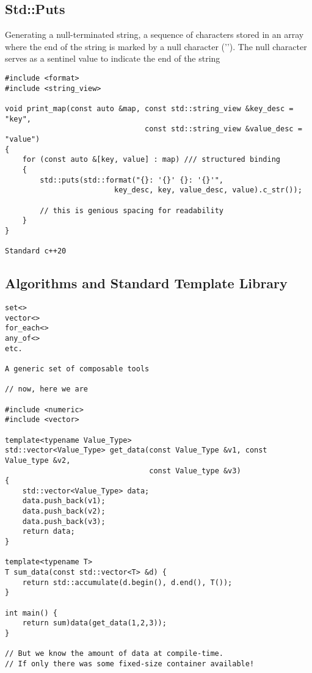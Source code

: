 \documentclass[openany]{report}
\begin{document}
\subsection{Std::Puts}

Generating a null-terminated string,  a sequence of characters stored in an array
where the end of the string is marked by a null character ('\0'). 
The null character serves as a sentinel value to indicate the end of the string

\begin{verbatim}
#include <format>
#include <string_view>

void print_map(const auto &map, const std::string_view &key_desc = "key",
                                const std::string_view &value_desc = "value")
{
    for (const auto &[key, value] : map) /// structured binding
    {
        std::puts(std::format("{}: '{}' {}: '{}'",
                         key_desc, key, value_desc, value).c_str());

        // this is genious spacing for readability
    }
}

Standard c++20
\end{verbatim}
\subsection{Algorithms and Standard Template Library}

\begin{verbatim}
set<>
vector<>
for_each<>
any_of<>
etc.

A generic set of composable tools

// now, here we are

#include <numeric>
#include <vector>

template<typename Value_Type>
std::vector<Value_Type> get_data(const Value_Type &v1, const Value_type &v2,
                                 const Value_type &v3)
{
    std::vector<Value_Type> data;
    data.push_back(v1);
    data.push_back(v2);
    data.push_back(v3);
    return data;
}

template<typename T>
T sum_data(const std::vector<T> &d) {
    return std::accumulate(d.begin(), d.end(), T());
}

int main() {
    return sum)data(get_data(1,2,3));
}

// But we know the amount of data at compile-time. 
// If only there was some fixed-size container available!

\end{verbatim}
\end{document}
